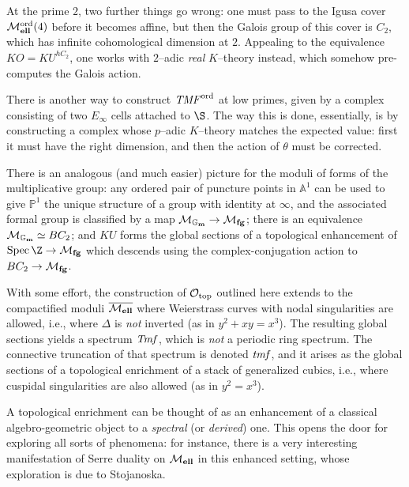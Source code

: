 \begin{remark}
At the prime $2$, two further things go wrong: one must pass to the Igusa cover $\mathcal{M}_{\mathbf{ell}}^{\mathrm{ord}}(4)$ before it becomes affine, but then the Galois group of this cover is $C_2$, which has infinite cohomological dimension at $2$.  Appealing to the equivalence $KO = KU^{hC_2}$, one works with $2$--adic \emph{real} $K$--theory instead, which somehow pre-computes the Galois action.
\end{remark}

\begin{remark}
There is another way to construct $\mathit{TMF}^{\mathrm{ord}}$ at low primes, given by a complex consisting of two $E_\infty$ cells attached to $\S$.  The way this is done, essentially, is by constructing a complex whose $p$--adic $K$--theory matches the expected value: first it must have the right dimension, and then the action of $\theta$ must be corrected.
\end{remark}

\begin{remark}
There is an analogous (and much easier) picture for the moduli of forms of the multiplicative group: any ordered pair of puncture points in $\mathbb A^1$ can be used to give $\mathbb P^1$ the unique structure of a group with identity at $\infty$, and the associated formal group is classified by a map $\mathcal{M}_{\mathbf{\mathbb G_m}} \to \mathcal{M}_{\mathbf{fg}}$; there is an equivalence $\mathcal{M}_{\mathbf{\mathbb G_m}} \simeq BC_2$; and $KU$ forms the global sections of a topological enhancement of $\Spec \Z \to \moduli{fg}$ which descends using the complex-conjugation action to $BC_2 \to \mathcal{M}_{\mathbf{fg}}$.
\end{remark}

\begin{remark}
With some effort, the construction of $\mathcal{O}_{\mathrm{top}}$ outlined here extends to the compactified moduli $\overline{\mathcal{M}_{\mathbf{ell}}}$ where Weierstrass curves with nodal singularities are allowed, i.e., where $\Delta$ is \emph{not} inverted (as in $y^2 + xy = x^3$).  The resulting global sections yields a spectrum $\mathit{Tmf}$, which is \emph{not} a periodic ring spectrum.  The connective truncation of that spectrum is denoted $\mathit{tmf}$, and it arises as the global sections of a topological enrichment of a stack of generalized cubics, i.e., where cuspidal singularities are also allowed (as in $y^2 = x^3$).
\end{remark}

\begin{remark}
A topological enrichment can be thought of as an enhancement of a classical algebro-geometric object to a \textit{spectral} (or \textit{derived}) one.  This opens the door for exploring all sorts of phenomena: for instance, there is a very interesting manifestation of Serre duality on $\mathcal{M}_{\mathbf{ell}}$ in this enhanced setting, whose exploration is due to Stojanoska.
\end{remark}




